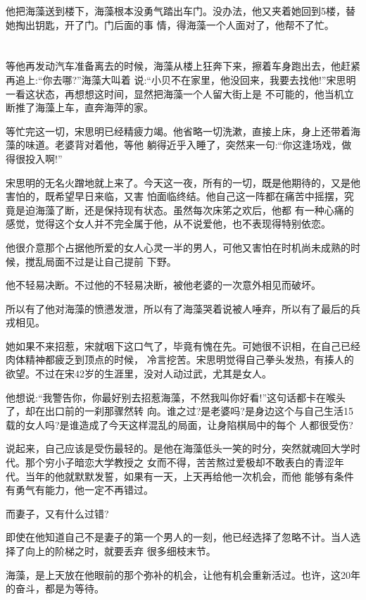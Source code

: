 \documentclass[11pt,a4paper,onecolumn]{article}
\begin{document}
他把海藻送到楼下，海藻根本没勇气踏出车门。没办法，他又夹着她回到5楼，替她掏出钥匙，开了门。门后面的事
情，得海藻一个人面对了，他帮不了忙。

\section[\thesection]{}

等他再发动汽车准备离去的时候，海藻从楼上狂奔下来，擦着车身跑出去，他赶紧再追上:``你去哪?''海藻大叫着
说:``小贝不在家里，他没回来，我要去找他!''宋思明一看这状态，再想想这时间，显然把海藻一个人留大街上是
不可能的，他当机立断推了海藻上车，直奔海萍的家。

等忙完这一切，宋思明已经精疲力竭。他省略一切洗漱，直接上床，身上还带着海藻的味道。老婆背对着他，等他
躺得近乎入睡了，突然来一句:``你这逢场戏，做得很投入啊!''

宋思明的无名火蹭地就上来了。今天这一夜，所有的一切，既是他期待的，又是他害怕的，既希望早日来临，又害
怕面临终结。他自己这一阵都在痛苦中摇摆，究竟是迫海藻了断，还是保持现有状态。虽然每次床笫之欢后，他都
有一种心痛的感觉，觉得这个女人并不完全属于他，从不说爱他，也不表现得特别依恋。

他很介意那个占据他所爱的女人心灵一半的男人，可他又害怕在时机尚未成熟的时候，搅乱局面不过是让自己提前
下野。

他不轻易决断。不过他的不轻易决断，被他老婆的一次意外相见而破坏。

所以有了他对海藻的愤懑发泄，所以有了海藻哭着说被人唾弃，所以有了最后的兵戎相见。

她如果不来招惹，宋就咽下这口气了，毕竟有愧在先。可她很不识相，在自己已经肉体精神都疲乏到顶点的时候，
冷言挖苦。宋思明觉得自己拳头发热，有揍人的欲望。不过在宋42岁的生涯里，没对人动过武，尤其是女人。

他想说:``我警告你，你最好别去招惹海藻，不然我叫你好看!''这句话都卡在喉头了，却在出口前的一刹那骤然转
向。谁之过?是老婆吗?是身边这个与自己生活15载的女人吗?是谁造成了今天这样混乱的局面，让身陷棋局中的每个
人都很受伤?

说起来，自己应该是受伤最轻的。是他在海藻低头一笑的时分，突然就魂回大学时代。那个穷小子暗恋大学教授之
女而不得，苦苦熬过爱极却不敢表白的青涩年代。当年的他就默默发誓，如果有一天，上天再给他一次机会，而他
能够有条件有勇气有能力，他一定不再错过。

而妻子，又有什么过错?

即使在他知道自己不是妻子的第一个男人的一刻，他已经选择了忽略不计。当人选择了向上的阶梯之时，就要丢弃
很多细枝末节。

海藻，是上天放在他眼前的那个弥补的机会，让他有机会重新活过。也许，这20年的奋斗，都是为等待。
\end{document}
